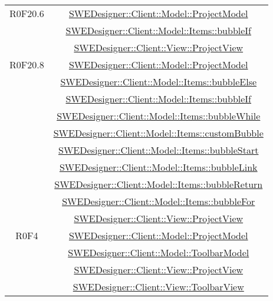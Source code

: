 \documentclass[../DefinizioneDiProdotto.tex]{subfiles}
\begin{document}
\begin{longtable}{|c|c|}
				R0F20.6
				& \hyperlink{SWEDesigner::Client::Model::ProjectModel}{SWEDesigner::Client::Model::ProjectModel}\\
				& \hyperlink{SWEDesigner::Client::Model::Items::bubbleIf}{SWEDesigner::Client::Model::Items::bubbleIf}\\
				& \hyperlink{SWEDesigner::Client::View::ProjectView}{SWEDesigner::Client::View::ProjectView}\\
				\hline

				R0F20.8
				& \hyperlink{SWEDesigner::Client::Model::ProjectModel}{SWEDesigner::Client::Model::ProjectModel}\\
				& \hyperlink{SWEDesigner::Client::Model::Items::bubbleElse}{SWEDesigner::Client::Model::Items::bubbleElse}\\
				& \hyperlink{SWEDesigner::Client::Model::Items::bubbleIf}{SWEDesigner::Client::Model::Items::bubbleIf}\\
				& \hyperlink{SWEDesigner::Client::Model::Items::bubbleWhile}{SWEDesigner::Client::Model::Items::bubbleWhile}\\
				& \hyperlink{SWEDesigner::Client::Model::Items::customBubble}{SWEDesigner::Client::Model::Items::customBubble}\\
				& \hyperlink{SWEDesigner::Client::Model::Items::bubbleStart}{SWEDesigner::Client::Model::Items::bubbleStart}\\
				& \hyperlink{SWEDesigner::Client::Model::Items::bubbleLink}{SWEDesigner::Client::Model::Items::bubbleLink}\\
				& \hyperlink{SWEDesigner::Client::Model::Items::bubbleReturn}{SWEDesigner::Client::Model::Items::bubbleReturn}\\
				& \hyperlink{SWEDesigner::Client::Model::Items::bubbleFor}{SWEDesigner::Client::Model::Items::bubbleFor}\\
				& \hyperlink{SWEDesigner::Client::View::ProjectView}{SWEDesigner::Client::View::ProjectView}\\
				\hline

				R0F4
				& \hyperlink{SWEDesigner::Client::Model::ProjectModel}{SWEDesigner::Client::Model::ProjectModel}\\
				& \hyperlink{SWEDesigner::Client::Model::ToolbarModel}{SWEDesigner::Client::Model::ToolbarModel}\\
				& \hyperlink{SWEDesigner::Client::View::ProjectView}{SWEDesigner::Client::View::ProjectView}\\
				& \hyperlink{SWEDesigner::Client::View::ToolbarView}{SWEDesigner::Client::View::ToolbarView}\\
				\hline


\end{longtable}
\end{document}
